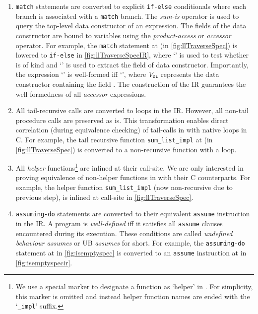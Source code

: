 \begin{enumerate}
\item {\tt match} statements are converted to explicit {\tt if-else} conditionals where each branch is
associated with a {\tt match} branch. The {\em sum-is} operator is used to query
the top-level data constructor of an expression. The fields of the data constructor are bound to
variables using the {\em product-access} or {\em accessor} operator.
For example, the {\tt match} statement at  (in \cref{fig:llTraverseSpec}) is lowered to {\tt if-else}
in \cref{fig:llTraverseSpecIR}, where `' is used to test whether  is
of kind  and `' is used to extract the  field of  data constructor.
Importantly, the expression `' is well-formed iff `', where $V_{{\tt fi}}$ represents the
data constructor containing the field .
The construction of the IR guarantees the well-formedness of all {\em accessor} expressions.
\item All tail-recursive calls are converted to loops in the IR. However, all non-tail procedure calls are preserved as is.
This transformation enables direct correlation (during equivalence checking) of tail-calls in \SpecL{} with native loops in C.
For example, the tail recursive function {\tt sum\_list\_impl} at  (in \cref{fig:llTraverseSpec}) is converted to a non-recursive function with a loop.
\item All {\em helper} functions\footnote{We use a special marker to designate a function as `helper' in \SpecL{}.
For simplicity, this marker is omitted and instead helper function names are ended with the `{\tt \_impl}' suffix.}
are inlined at their call-site.
We are only interested in proving equivalence of non-helper functions in \SpecL{} with their C counterparts.
For example, the helper function {\tt sum\_list\_impl} (now non-recursive due to previous step), is inlined
at call-site  in \cref{fig:llTraverseSpec}.
\item {\tt assuming-do} statements are converted to their equivalent {\tt assume} instruction in the IR.
A \SpecL{} program is {\em well-defined} iff it satisfies all {\tt assume} clauses encountered during its execution.
These conditions are called {\em undefined behaviour assumes} or UB {\em assumes} for short.
For example, the {\tt assuming-do} statement at  in \cref{fig:isemptyspec} is converted to an {\tt assume}
instruction at  in \cref{fig:isemptyspecir}.
\end{enumerate}

